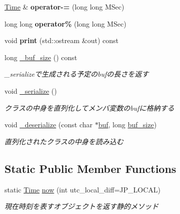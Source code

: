 \begin{DoxyCompactItemize}
\hyperlink{classskl_1_1_time}{Time} \& {\bfseries operator-\/=} (long long M\+Sec)
\item 
\hypertarget{classskl_1_1_time_a2b1f64ac04f08ec0516c99c402afed2a}{}\label{classskl_1_1_time_a2b1f64ac04f08ec0516c99c402afed2a} 
long long {\bfseries operator\%} (long long M\+Sec)
\item 
\hypertarget{classskl_1_1_time_ae6befd5d3f2ae2bca4f600860b2205a9}{}\label{classskl_1_1_time_ae6befd5d3f2ae2bca4f600860b2205a9} 
void {\bfseries print} (std\+::ostream \&out) const
\item 
\hypertarget{classskl_1_1_time_a49211f29831d4821318db5b45afb5bfe}{}\label{classskl_1_1_time_a49211f29831d4821318db5b45afb5bfe} 
long \hyperlink{classskl_1_1_time_a49211f29831d4821318db5b45afb5bfe}{\+\_\+buf\+\_\+size} () const
\begin{DoxyCompactList}\small\item\em \+\_\+serializeで生成される予定のbufの長さを返す \end{DoxyCompactList}\item 
\hypertarget{classskl_1_1_time_ae251fce04eb6c0d5181485b2393b3273}{}\label{classskl_1_1_time_ae251fce04eb6c0d5181485b2393b3273} 
void \hyperlink{classskl_1_1_time_ae251fce04eb6c0d5181485b2393b3273}{\+\_\+serialize} ()
\begin{DoxyCompactList}\small\item\em クラスの中身を直列化してメンバ変数のbufに格納する \end{DoxyCompactList}\item 
\hypertarget{classskl_1_1_time_a62573da15db11ef9379b7b113c972ab6}{}\label{classskl_1_1_time_a62573da15db11ef9379b7b113c972ab6} 
void \hyperlink{classskl_1_1_time_a62573da15db11ef9379b7b113c972ab6}{\+\_\+deserialize} (const char $\ast$\hyperlink{classskl_1_1_serializable_a1d203d9f0049ce37183a0dcefbc6399a}{buf}, long \hyperlink{classskl_1_1_serializable_a087eb19fada917a42b8411bfecbac0f1}{buf\+\_\+size})
\begin{DoxyCompactList}\small\item\em 直列化されたクラスの中身を読み込む \end{DoxyCompactList}\end{DoxyCompactItemize}
\subsection*{Static Public Member Functions}
\begin{DoxyCompactItemize}
\item 
static \hyperlink{classskl_1_1_time}{Time} \hyperlink{classskl_1_1_time_a017b1cdbe2841f1b7f4c9323e3cac184}{now} (int utc\+\_\+local\+\_\+diff=J\+P\+\_\+\+L\+O\+C\+AL)
\begin{DoxyCompactList}\small\item\em 現在時刻を表すオブジェクトを返す静的メソッド \end{DoxyCompactList}\end{DoxyCompactItemize}
